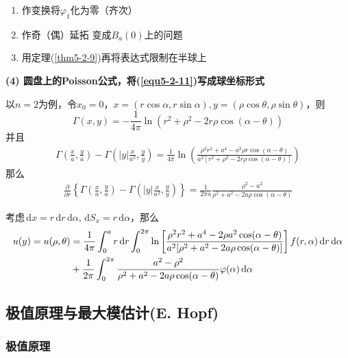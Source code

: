 \documentclass[11pt, a4paper]{article}
\theoremstyle{theorem}
\newcommand{\intd}[1]{\,\mathrm{d}{#1}}
\begin{document}
\begin{enumerate}[Step 1:]
    \item 作变换将$\varphi_1$化为零（齐次）
    \item 作奇（偶）延拓 变成$B_a(0)$上的问题
    \item 用定理(\ref{thm5-2-9})再将表达式限制在半球上
\end{enumerate}

\textbf{(4) 圆盘上的Poisson公式，将(\ref{equ5-2-11})写成球坐标形式}

以$n = 2$为例，令$x_0 = 0$，$x = (r \cos \alpha, r \sin \alpha), y = (\rho \cos \theta, \rho \sin \theta)$，则
$$
\Gamma(x,y) = - \frac{1}{4 \pi} \ln (r^2 + \rho^2 - 2 r \rho \cos(\alpha - \theta))
$$
并且
\begin{align*}
    \Gamma\left(\frac{x}{a}, \frac{y}{a}\right) - \Gamma\left(|y|\frac{x}{a^2}, \frac{y}{y}\right) = \frac{1}{4 \pi} \ln \left(\frac{\rho^2 r^2 + a^4 -  a^2 \rho r \cos(\alpha - \theta)}{a^2 [r^2 + \rho^2 - 2 r \rho \cos(\alpha - \theta)]}\right)
\end{align*}
那么
\begin{align*}
    \frac{\partial}{\partial r} \left\{\Gamma\left(\frac{x}{a}, \frac{y}{a}\right) - \Gamma\left(|y|\frac{x}{a^2}, \frac{y}{y}\right)\right\} = \frac{1}{2 \pi a} \frac{\rho^2 - a^2}{\rho^2 + a^2 - 2 a \rho \cos(\alpha - \theta)}
\end{align*}

考虑$\intd x = r \intd r \intd \alpha, \intd S_x = r \intd \alpha$，那么
\begin{align}
    \label{eq5-2-12}
    u(y) = u(\rho, \theta) &= \frac{1}{4 \pi} \int_0^a r \intd r \int_0^{2 \pi} \ln \left[\frac{\rho^2 r^2 + a^4 - 2 \rho a^2\cos(\alpha - \theta)}{a^2 [\rho^2 + a^2 - 2 a \rho \cos(\alpha - \theta)]}\right] f(r,\alpha) \intd r \intd \alpha \notag \\
    &+ \frac{1}{2 \pi} \int_0^{2 \pi} \frac{a^2 - \rho^2}{\rho^2 + a^2 - 2 a \rho \cos(\alpha - \theta)} \varphi(\alpha) \intd \alpha
\end{align}

\subsection{极值原理与最大模估计(E. Hopf)}

\subsubsection{极值原理}
\end{document}
